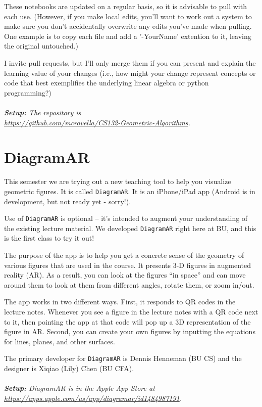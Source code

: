 \documentclass[11pt]{article}
\begin{document}
These notebooks are updated on a regular basis, so it is
advisable to pull with each use.  (However, if you make local edits,
you'll want to work out a 
system to make sure you don't accidentally overwrite any edits you've
made when pulling. One example is to copy each file and add a
'-YourName' extention to it, leaving the original untouched.)

I invite pull requests, but I'll only merge them
if you can present and explain the learning value of your changes (i.e.,
how might your change represent concepts or code that best
exemplifies the underlying linear algebra or python
programming?) 
\\
~\\\emph{\textbf{Setup:} The
repository is \\
\url{https://github.com/mcrovella/CS132-Geometric-Algorithms}.}

\section*{DiagramAR} 

This semester we are trying out a new teaching tool to help you
visualize geometric figures.   It is called \texttt{DiagramAR}.  It is
an iPhone/iPad app (Android is in development, but not ready yet - sorry!).

Use of \texttt{DiagramAR} is optional -- it's intended to augment your
understanding of the existing lecture material.    We developed
\texttt{DiagramAR} right here at BU, and this is the first class to try it out!

The purpose of the app is to help you get a concrete sense of the
geometry of various figures that are used in the course.    It presents
3-D figures in augmented reality (AR).   As a result, you can look at the
figures ``in space'' and can move around them to look at them from
different angles, rotate them, or zoom in/out.

The app works in two different ways.    First, it responds to QR codes
in the lecture notes.   Whenever you see a figure in the lecture notes
with a QR code next to it, then pointing the app at that code will pop
up a 3D representation of the figure in AR.    Second, you can create
your own figures by inputting the equations for lines, planes, and other
surfaces.

The primary developer for \texttt{DiagramAR} is Dennis
Henneman (BU CS) and the designer is Xiqiao (Lily) Chen (BU CFA).   
\\
~\\\emph{\textbf{Setup:} 
DiagramAR is in the Apple App Store at \\
\url{https://apps.apple.com/us/app/diagramar/id1484987191}. }
\end{document}
